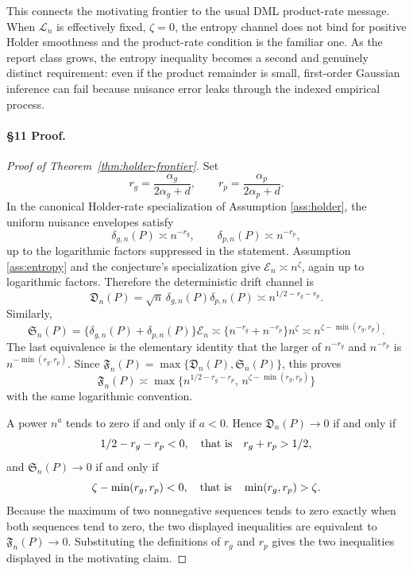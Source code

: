 This connects the motivating frontier to the usual DML product-rate message.
When \(\mathcal L_n\) is effectively fixed, \(\zeta=0\), the entropy channel
does not bind for positive Holder smoothness and the product-rate condition is
the familiar one.  As the report class grows, the entropy inequality becomes a
second and genuinely distinct requirement: even if the product remainder is
small, first-order Gaussian inference can fail because nuisance error leaks
through the indexed empirical process.

\paragraph{\S11 Proof.}
\begin{proof}[Proof of Theorem~\ref{thm:holder-frontier}]
Set
\[
r_g=\frac{\alpha_g}{2\alpha_g+d},
\qquad
r_p=\frac{\alpha_p}{2\alpha_p+d}.
\]
In the canonical Holder-rate specialization of Assumption \ref{ass:holder},
the uniform nuisance envelopes satisfy
\[
\delta_{g,n}(P)\asymp n^{-r_g},
\qquad
\delta_{p,n}(P)\asymp n^{-r_p},
\]
up to the logarithmic factors suppressed in the statement.  Assumption
\ref{ass:entropy} and the conjecture's specialization give
\(\mathcal{E}_n\asymp n^\zeta\), again up to logarithmic factors.  Therefore
the deterministic drift channel is
\[
\mathfrak D_n(P)
=\sqrt n\,\delta_{g,n}(P)\delta_{p,n}(P)
\asymp
n^{1/2-r_g-r_p}.
\]
Similarly,
\[
\mathfrak S_n(P)
=\{\delta_{g,n}(P)+\delta_{p,n}(P)\}\mathcal{E}_n
\asymp
\{n^{-r_g}+n^{-r_p}\}n^\zeta
\asymp
n^{\zeta-\min(r_g,r_p)}.
\]
The last equivalence is the elementary identity that the larger of
\(n^{-r_g}\) and \(n^{-r_p}\) is \(n^{-\min(r_g,r_p)}\).  Since
\(\mathfrak F_n(P)=\max\{\mathfrak D_n(P),\mathfrak S_n(P)\}\), this proves
\[
\mathfrak F_n(P)\asymp
\max\{n^{1/2-r_g-r_p},\,n^{\zeta-\min(r_g,r_p)}\}
\]
with the same logarithmic convention.

A power \(n^a\) tends to zero if and only if \(a<0\).  Hence
\(\mathfrak D_n(P)\to0\) if and only if
\[
1/2-r_g-r_p<0,
\quad\hbox{that is}\quad
r_g+r_p>1/2,
\]
and \(\mathfrak S_n(P)\to0\) if and only if
\[
\zeta-\min(r_g,r_p)<0,
\quad\hbox{that is}\quad
\min(r_g,r_p)>\zeta.
\]
Because the maximum of two nonnegative sequences tends to zero exactly when
both sequences tend to zero, the two displayed inequalities are equivalent to
\(\mathfrak F_n(P)\to0\).  Substituting the definitions of \(r_g\) and \(r_p\)
gives the two inequalities displayed in the motivating claim.


\end{proof}
